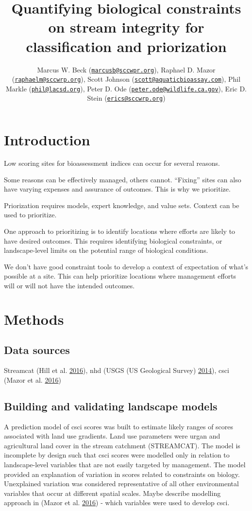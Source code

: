\documentclass[]{article}
\title{Quantifying biological constraints on stream integrity for
classification and priorization}
\author{Marcus W. Beck
(\href{mailto:marcusb@sccwpr.org}{\nolinkurl{marcusb@sccwpr.org}}),
Raphael D. Mazor
(\href{mailto:raphaelm@sccwrp.org}{\nolinkurl{raphaelm@sccwrp.org}}),
Scott Johnson
(\href{mailto:scott@aquaticbioassay.com}{\nolinkurl{scott@aquaticbioassay.com}}),
Phil Markle (\href{mailto:phil@lacsd.org}{\nolinkurl{phil@lacsd.org}}),
Peter D. Ode
(\href{mailto:peter.ode@wildlife.ca.gov}{\nolinkurl{peter.ode@wildlife.ca.gov}}),
Eric D. Stein
(\href{mailto:erics@sccwrp.org}{\nolinkurl{erics@sccwrp.org}})}
\date{}
\begin{document}
\maketitle

\section{Introduction}\label{introduction}

Low scoring sites for bioassessment indices can occur for several
reasons.

Some reasons can be effectively managed, others cannot. ``Fixing'' sites
can also have varying expenses and assurance of outcomes. This is why we
prioritize.

Priorization requires models, expert knowledge, and value sets. Context
can be used to prioritize.

One approach to prioritizing is to identify locations where efforts are
likely to have desired outcomes. This requires identifying biological
constraints, or landscape-level limits on the potential range of
biological conditions.

We don't have good constraint tools to develop a context of expectation
of what's possible at a site. This can help prioritize locations where
management efforts will or will not have the intended outcomes.

\section{Methods}\label{methods}

\subsection{Data sources}\label{data-sources}

Streamcat (Hill et al. \protect\hyperlink{ref-Hill16}{2016}), \ac{nhd}
(USGS (US Geological Survey) \protect\hyperlink{ref-USGS14}{2014}),
\ac{csci} (Mazor et al. \protect\hyperlink{ref-Mazor16}{2016})

\subsection{Building and validating landscape
models}\label{building-and-validating-landscape-models}

A prediction model of \ac{csci} scores was built to estimate likely
ranges of scores associated with land use gradients. Land use parameters
were urgan and agricultural land cover in the stream catchment
(STREAMCAT). The model is incomplete by design such that \ac{csci}
scores were modelled only in relation to landscape-level variables that
are not easily targeted by management. The model provided an explanation
of variation in scores related to constraints on biology. Unexplained
variation was considered representative of all other environmental
variables that occur at different spatial scales. Maybe describe
modelling approach in (Mazor et al.
\protect\hyperlink{ref-Mazor16}{2016}) - which variables were used to
develop \ac{csci}.
\end{document}

